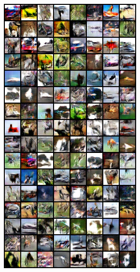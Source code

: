 \begin{figure}[H]
    \begin{subfigure}{0.2\textwidth}
        \centering
        \includegraphics[width=0.95\linewidth]{cifar10/32/fake_sample_epoch_0015.png}
        \caption{}
        \label{subfig:cifar10/32/fake_sample_epoch_0015}
    \end{subfigure}%
    \begin{subfigure}{0.2\textwidth}

\end{subfigure}
\end{figure}
